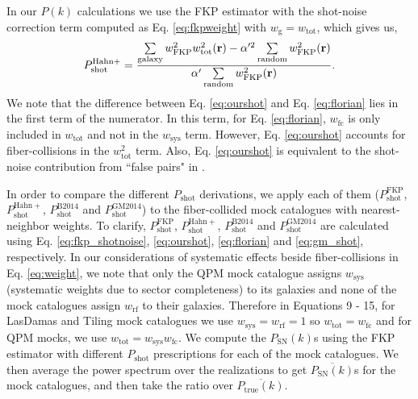 \documentclass{emulateapj}
\begin{document}
In our $P(k)$ calculations we use the FKP estimator with the shot-noise correction term computed as Eq. \ref{eq:fkpweight} with $w_\mathrm{g} = w_\mathrm{tot}$, which gives us, 
\begin{equation} \label{eq:ourshot}
P^\mathrm{Hahn+}_\mathrm{shot} = \frac{\sum\limits_{\mathrm{galaxy}} w^2_\mathrm{FKP}w^2_\mathrm{tot}({\bf r}) - \alpha'^2 \sum\limits_{\mathrm{random}} w_\mathrm{FKP}^2({\bf r})}{\alpha' \sum\limits_{\mathrm{random}}w_\mathrm{FKP}^2({\bf r})}.
\end{equation}
We note that the difference between Eq. \ref{eq:ourshot} and Eq. \ref{eq:florian} lies in the first term of the numerator. In this term, for Eq. \ref{eq:florian}, $w_\mathrm{fc}$ is only included in $w_\mathrm{tot}$ and not in the $w_\mathrm{sys}$ term. However, Eq. \ref{eq:ourshot} accounts for fiber-collisions in the $w_\mathrm{tot}^2$ term. Also, Eq. \ref{eq:ourshot} is equivalent to the shot-noise contribution from ``false pairs" in \cite{Gil-Marin:2014aa}. 

In order to compare the different $P_\mathrm{shot}$ derivations, we apply each of them ($P^\mathrm{FKP}_\mathrm{shot}$, $P^\mathrm{Hahn+}_\mathrm{shot}$, $P^\mathrm{B2014}_\mathrm{shot}$ and $P^\mathrm{GM2014}_\mathrm{shot}$) to the fiber-collided mock catalogues with nearest-neighbor weights. To clarify, $P^\mathrm{FKP}_\mathrm{shot}$, $P^\mathrm{Hahn+}_\mathrm{shot}$, $P^\mathrm{B2014}_\mathrm{shot}$ and $P^\mathrm{GM2014}_\mathrm{shot}$ are calculated using Eq. \ref{eq:fkp_shotnoise}, \ref{eq:ourshot}, \ref{eq:florian} and \ref{eq:gm_shot}, respectively. In our considerations of systematic effects beside fiber-collisions in Eq. \ref{eq:weight}, we note that only the QPM mock catalogue assigns $w_\mathrm{sys}$ (systematic weights due to sector completeness) to its galaxies and none of the mock catalogues assign $w_\mathrm{rf}$ to their galaxies. Therefore in Equations 9 - 15, for LasDamas and Tiling mock catalogues we use $w_\mathrm{sys} = w_\mathrm{rf} = 1$ so $w_\mathrm{tot} = w_\mathrm{fc}$ and for QPM mocks, we use $w_\mathrm{tot} = w_\mathrm{sys} w_\mathrm{fc}$. We compute the $P_\mathrm{SN}(k)$s using the FKP estimator with different $P_\mathrm{shot}$ prescriptions for each of the mock catalogues. We then average the power spectrum over the realizations to get $\overline{P_\mathrm{SN}(k)}$s for the mock catalogues, and then take the ratio over $\overline{P_\mathrm{true}(k)}$. 
\end{document}
